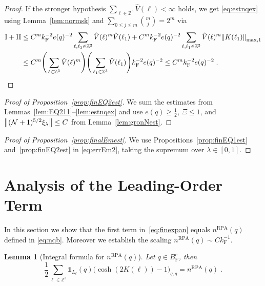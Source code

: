 \documentclass[12pt,a4paper]{article}
\numberwithin{equation}{section}
\newcommand{\1}{\mathbb{I}}
\newcommand{\F}{\mathrm{F}}
\newcommand{\I}{\mathrm{I}}
\newcommand{\II}{\mathrm{II}}
\newcommand{\RPA}{\mathrm{RPA}}
\newcommand{\kF}{k_\F}
\newcommand{\Zstar}{\mathbb{Z}^3} %
\newcommand{\Z}{\mathbb{Z}}
\newcommand{\NN}{\mathcal{N}}
\newcommand{\half}{\frac{1}{2}}
\theoremstyle{plain}
\newtheorem{lemma}[theorem]{Lemma}
\theoremstyle{definition}
\theoremstyle{remark}
\theoremstyle{plain}
\theoremstyle{definition}
\theoremstyle{remark}
\begin{document}
\begin{proof}
If the stronger hypothesis $ \sum_{\ell \in \Zstar} \hat{V}(\ell) < \infty $ holds, we get \eqref{eq:estnqex} using Lemma~\ref{lem:normsk} and $ \sum_{0 \le j \le m} {{m}\choose j} = 2^m $ via
\begin{align}
	\I + \II
	&\leq C^m \kF^{-2} e(q)^{-2} \sum_{\ell,\ell_1 \in \Zstar}
		\hat{V}(\ell)^m
		\hat{V}(\ell_1)
	+ C^m \kF^{-2} e(q)^{-2} \sum_{\ell,\ell_1 \in \Zstar}
		\hat{V}(\ell)^m
		\norm{K(\ell_1)}_{\max,1} \nonumber\\
	&\leq C^m
		\Bigg( \sum\limits_{\ell \in \Zstar} \hat{V}(\ell)^m \Bigg)
		\Bigg( \sum\limits_{\ell_1 \in \Zstar} \hat{V}(\ell_1) \Bigg)
		\kF^{-2} e(q)^{-2}
	\leq C^m \kF^{-2} e(q)^{-2} \;. \qedhere \nonumber
\end{align}
\end{proof}



\begin{proof}[Proof of Proposition~\ref{prop:finEQ2est}]
We sum the estimates from Lemmas~\ref{lem:EQ211}--\ref{lem:estnqex} and use $ e(q) \ge \half $, $ \Xi \le 1 $, and $ \norm{(\NN+1)^{5/2} \xi_\lambda} \le C $ from Lemma~\ref{lem:gronNest}.
\end{proof}



\begin{proof}[Proof of Proposition~\ref{prop:finalEmest}]
We use Propositions~\ref{prop:finEQ1est} and~\ref{prop:finEQ2est} in \eqref{eq:errEm2}, taking the supremum over $ \lambda \in [0,1] $.
\end{proof}



\section{Analysis of the Leading-Order Term}
\label{sec:leading_order_analysis}


In this section we show that the first term in~\eqref{eq:finexpan} equals $ n^{\RPA}(q) $ defined in \eqref{eq:nqb}. Moreover we establish the scaling $ n^{\RPA}(q) \sim C \kF^{-1} $.



\begin{lemma}[Integral formula for $ n^{\RPA}(q) $] \label{lem:nqb_integralrecovery}
Let $q \in B^c_{\F}$, then
\begin{equation} \label{eq:nqb_integralrecovery}
	\half\sum_{\ell\in \Zstar}\mathds{1}_{L_\ell}(q) \big( \cosh(2K(\ell)) - 1 \big)_{q,q} = n^{\RPA}(q)\;.
\end{equation}
\end{lemma}
\end{document}
